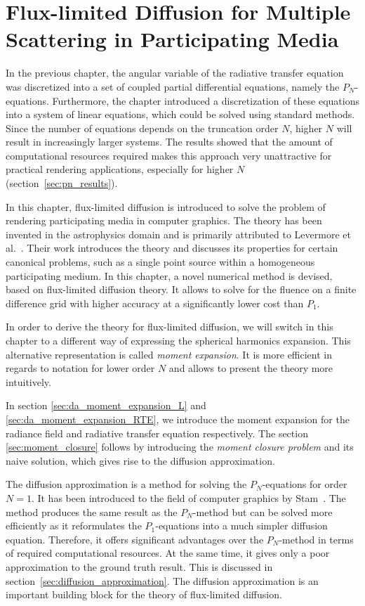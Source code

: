 \chapter[FLD for Multiple Scattering in Participating Media]{Flux-limited Diffusion for Multiple Scattering in Participating Media}
\label{sec:fld}

In the previous chapter, the angular variable of the radiative transfer equation was discretized into a set of coupled partial differential equations, namely the $P_N$-equations. Furthermore, the chapter introduced a discretization of these equations into a system of linear equations, which could be solved using standard methods. Since the number of equations depends on the truncation order $N$, higher $N$ will result in increasingly larger systems. The results showed that the amount of computational resources required makes this approach very unattractive for practical rendering applications, especially for higher $N$ (section~\ref{sec:pn_results}).

In this chapter, flux-limited diffusion is introduced to solve the problem of rendering participating media in computer graphics. The theory has been invented in the astrophysics domain and is primarily attributed to Levermore et al.~\cite{Levermore81}. Their work introduces the theory and discusses its properties for certain canonical problems, such as a single point source within a homogeneous participating medium. In this chapter, a novel numerical method is devised, based on flux-limited diffusion theory. It allows to solve for the fluence on a finite difference grid with higher accuracy at a significantly lower cost than $P_1$.

In order to derive the theory for flux-limited diffusion, we will switch in this chapter to a different way of expressing the spherical harmonics expansion. This alternative representation is called \emph{moment expansion}. It is more efficient in regards to notation for lower order $N$ and allows to present the theory more intuitively.

In section \ref{sec:da_moment_expansion_L} and \ref{sec:da_moment_expansion_RTE}, we introduce the moment expansion for the radiance field and radiative transfer equation respectively. The section \ref{sec:moment_closure} follows by introducing the \emph{moment closure problem} and its naive solution, which gives rise to the diffusion approximation.

The diffusion approximation is a method for solving the $P_N$-equations for order $N=1$. It has been introduced to the field of computer graphics by Stam~\cite{Stam95}. The method produces the same result as the $P_N$-method but can be solved more efficiently as it reformulates the $P_1$-equations into a much simpler diffusion equation. Therefore, it offers significant advantages over the $P_N$-method in terms of required computational resources. At the same time, it gives only a poor approximation to the ground truth result. This is discussed in section~\ref{sec:diffusion_approximation}. The diffusion approximation is an important building block for the theory of flux-limited diffusion.

